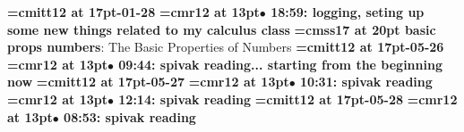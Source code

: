 {\medskip\noindent\bf\font\titlefont=cmitt12 at 17pt-01-28}\medskip
{\smallskip\noindent\bf\font\titlefont=cmr12 at 13pt\titlefont $\bullet$ 18:59: logging, seting up some new things related to my calculus class}\smallskip
{}
{\medskip\noindent\bf\font\titlefont=cmss17 at 20pt basic props numbers}: The Basic Properties of Numbers
{\medskip\noindent\bf\font\titlefont=cmitt12 at 17pt-05-26}\medskip
{\smallskip\noindent\bf\font\titlefont=cmr12 at 13pt\titlefont $\bullet$ 09:44: spivak reading... starting from the beginning now}\smallskip
{\medskip\noindent\bf\font\titlefont=cmitt12 at 17pt-05-27}\medskip
{\smallskip\noindent\bf\font\titlefont=cmr12 at 13pt\titlefont $\bullet$ 10:31: spivak reading}\smallskip
{\smallskip\noindent\bf\font\titlefont=cmr12 at 13pt\titlefont $\bullet$ 12:14: spivak reading}\smallskip
{\medskip\noindent\bf\font\titlefont=cmitt12 at 17pt-05-28}\medskip
{\smallskip\noindent\bf\font\titlefont=cmr12 at 13pt\titlefont $\bullet$ 08:53: spivak reading}\smallskip
\bye
